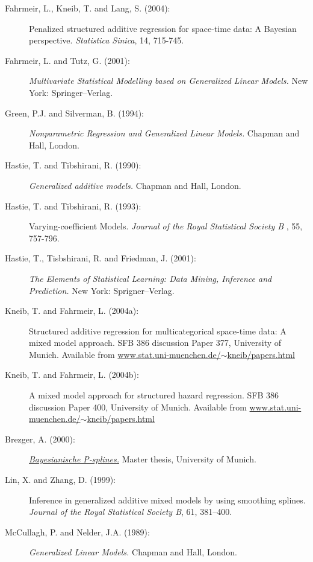 \begin{description}

\item[Fahrmeir, L., Kneib, T. and Lang, S. (2004):] Penalized
structured additive regression for space-time data: A Bayesian
perspective. {\it Statistica Sinica}, 14, 715-745.

\item[Fahrmeir, L. and Tutz, G. (2001):] {\em Multivariate
Statistical Modelling based on Generalized Linear Models.} New
York: Springer--Verlag.

\item[Green, P.J. and Silverman, B. (1994):] {\em Nonparametric Regression and Generalized Linear Models.} Chapman
and Hall, London.

\item[Hastie, T. and Tibshirani, R. (1990):] {\em Generalized additive models.} Chapman and
Hall, London.

\item[Hastie, T. and Tibshirani, R. (1993):] Varying-coefficient Models.
{\em Journal of the Royal Statistical Society B} , 55, 757-796.

\item[Hastie, T., Tisbshirani, R. and Friedman, J. (2001):] {\em The Elements of Statistical Learning: Data Mining,
Inference and Prediction.} New York: Sprigner--Verlag.

\item[Kneib, T. and Fahrmeir, L. (2004a):] Structured additive
regression for multicategorical space-time data: A mixed model
approach. SFB 386 discussion Paper 377, University of Munich.
Available from
\href{http://www.stat.uni-muenchen.de/~kneib/papers.html}{www.stat.uni-muenchen.de/$\sim$kneib/papers.html}

\item[Kneib, T. and Fahrmeir, L. (2004b):] A mixed model approach
for structured hazard regression. SFB 386 discussion Paper 400,
University of Munich. Available from
\href{http://www.stat.uni-muenchen.de/~kneib/papers.html}{www.stat.uni-muenchen.de/$\sim$kneib/papers.html}

\item[Brezger, A. (2000):]
\href{http://www.stat.uni-muenchen.de/~andib} {\em Bayesianische
P-splines.} Master thesis, University of Munich.

\item[Lin, X. and Zhang, D. (1999):] Inference in generalized additive mixed models by using
smoothing splines. {\it Journal of the Royal Statistical Society
B}, 61, 381--400.

\item[McCullagh, P. and Nelder, J.A. (1989):] {\em Generalized Linear Models.} Chapman and Hall, London.

\end{description}
